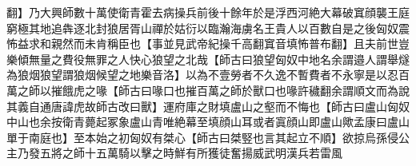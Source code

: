 翻】乃大興師數十萬使衛青霍去病操兵前後十餘年於是浮西河絶大幕破窴顔襲王庭窮極其地追犇逐北封狼居胥山禪於姑衍以臨瀚海虜名王貴人以百數自是之後匈奴震怖益求和親然而未肯稱臣也【事並見武帝紀操千高翻窴音填怖普布翻】且夫前世豈樂傾無量之費役無罪之人快心狼望之北哉【師古曰狼望匈奴中地名余謂邉人謂舉燧為狼烟狼望謂狼烟候望之地樂音洛】以為不壹勞者不久逸不暫費者不永寧是以忍百萬之師以摧餓虎之喙【師古曰喙口也摧百萬之師於獸口也喙許穢翻余謂順文而為說其義自通唐諱虎故師古改曰獸】運府庫之財填盧山之壑而不悔也【師古曰盧山匈奴中山也余按衛青薨起冢象盧山青唯絶幕至填顔山耳或者寘顔山即盧山歟孟康曰盧山單于南庭也】至本始之初匈奴有桀心【師古曰桀竪也言其起立不順】欲掠烏孫侵公主乃發五將之師十五萬騎以擊之時鮮有所獲徒奮揚威武明漢兵若雷風